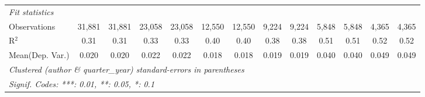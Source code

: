 \begin{tabular}{lcccccccccccc}
   \midrule
   \emph{Fit statistics}\\
   Observations                             & 31,881       & 31,881       & 23,058       & 23,058   & 12,550       & 12,550         & 9,224        & 9,224         & 5,848         & 5,848        & 4,365         & 4,365\\  
   R$^2$                                    & 0.31         & 0.31         & 0.33         & 0.33     & 0.40         & 0.40           & 0.38         & 0.38          & 0.51          & 0.51         & 0.52          & 0.52\\  
Mean(Dep. Var.) & 0.020 & 0.020 & 0.022 & 0.022 & 0.018 & 0.018 & 0.019 & 0.019 & 0.040 & 0.040 & 0.049 & 0.049 \\
   \midrule \midrule
   \multicolumn{13}{l}{\emph{Clustered (author \& quarter\_year) standard-errors in parentheses}}\\
   \multicolumn{13}{l}{\emph{Signif. Codes: ***: 0.01, **: 0.05, *: 0.1}}\\
\end{tabular}
\par\endgroup
